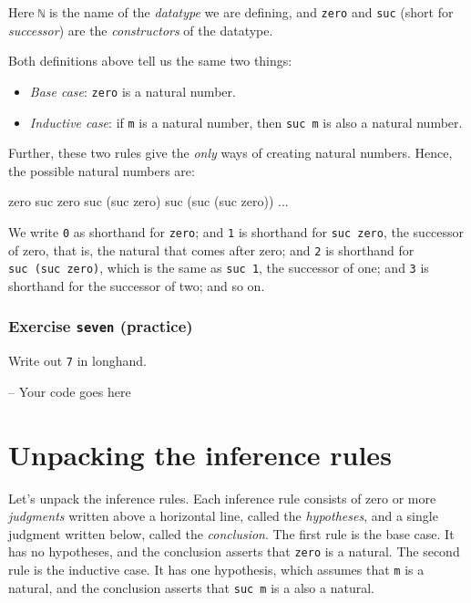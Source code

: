 Here \texttt{ℕ} is the name of the \emph{datatype} we are defining, and
\texttt{zero} and \texttt{suc} (short for \emph{successor}) are the
\emph{constructors} of the datatype.

Both definitions above tell us the same two things:

\begin{itemize}
\tightlist
\item
  \emph{Base case}: \texttt{zero} is a natural number.
\item
  \emph{Inductive case}: if \texttt{m} is a natural number, then
  \texttt{suc\ m} is also a natural number.
\end{itemize}

Further, these two rules give the \emph{only} ways of creating natural
numbers. Hence, the possible natural numbers are:

\begin{myDisplay}
zero
suc zero
suc (suc zero)
suc (suc (suc zero))
...
\end{myDisplay}

We write \texttt{0} as shorthand for \texttt{zero}; and \texttt{1} is
shorthand for \texttt{suc\ zero}, the successor of zero, that is, the
natural that comes after zero; and \texttt{2} is shorthand for
\texttt{suc\ (suc\ zero)}, which is the same as \texttt{suc\ 1}, the
successor of one; and \texttt{3} is shorthand for the successor of two;
and so on.

\hypertarget{Naturals-seven}{%
\subsubsection{\texorpdfstring{Exercise \texttt{seven}
(practice)}{Exercise seven (practice)}}\label{Naturals-seven}}

Write out \texttt{7} in longhand.

\begin{fence}
\begin{code}
-- Your code goes here
\end{code}
\end{fence}

\hypertarget{unpacking-the-inference-rules}{%
\section{Unpacking the inference
rules}\label{unpacking-the-inference-rules}}

Let's unpack the inference rules. Each inference rule consists of zero
or more \emph{judgments} written above a horizontal line, called the
\emph{hypotheses}, and a single judgment written below, called the
\emph{conclusion}. The first rule is the base case. It has no
hypotheses, and the conclusion asserts that \texttt{zero} is a natural.
The second rule is the inductive case. It has one hypothesis, which
assumes that \texttt{m} is a natural, and the conclusion asserts that
\texttt{suc\ m} is a also a natural.

